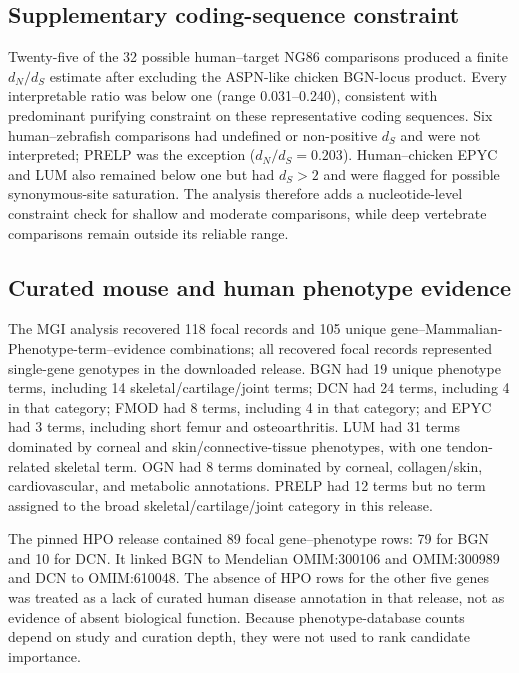 \subsection{Supplementary coding-sequence constraint}
\label{subsec:results-codon-constraint}

Twenty-five of the 32 possible human--target NG86 comparisons produced a finite
$d_N/d_S$ estimate after excluding the ASPN-like chicken BGN-locus product.
Every interpretable ratio was below one (range 0.031--0.240), consistent with
predominant purifying constraint on these representative coding sequences.
Six human--zebrafish comparisons had undefined or non-positive $d_S$
and were not interpreted; PRELP was the exception ($d_N/d_S=0.203$).
Human--chicken EPYC and LUM also remained below one but had $d_S>2$ and were
flagged for possible synonymous-site saturation. The analysis therefore adds a
nucleotide-level constraint check for shallow and moderate comparisons, while
deep vertebrate comparisons remain outside its reliable range.

\subsection{Curated mouse and human phenotype evidence}
\label{subsec:results-phenotypes}

The MGI analysis recovered 118 focal records and 105 unique
gene--Mammalian-Phenotype-term--evidence combinations; all recovered focal
records represented single-gene genotypes in the downloaded release. BGN had
19 unique phenotype terms, including 14 skeletal/cartilage/joint terms; DCN had
24 terms, including 4 in that category; FMOD had
8 terms, including 4 in that category; and EPYC had 3 terms, including short
femur and osteoarthritis. LUM had 31 terms dominated by corneal and
skin/connective-tissue phenotypes, with one tendon-related skeletal term. OGN
had 8 terms dominated by corneal, collagen/skin, cardiovascular, and metabolic
annotations. PRELP had 12 terms but no term assigned to the broad
skeletal/cartilage/joint category in this release.

The pinned HPO release contained 89 focal gene--phenotype rows: 79 for BGN and
10 for DCN. It linked BGN to Mendelian OMIM:300106 and OMIM:300989 and DCN to
OMIM:610048. The absence of HPO rows for the other five genes was treated as a lack of curated human
disease annotation in that release, not as evidence of absent biological
function. Because phenotype-database counts depend on study and curation depth,
they were not used to rank candidate importance.

